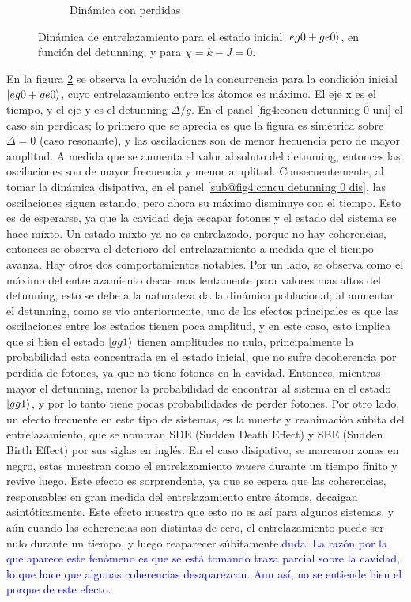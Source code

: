 \begin{figure}[h]
\begin{subfigure}{0.49\textwidth}
        \caption{Dinámica con perdidas}
        \label{fig4:concu detunning 0 dis}
    \end{subfigure}
    \caption{Dinámica de entrelazamiento para el estado inicial $\ket{eg0+ge0}$, en función del detunning, y para $\chi=k-J=0$.}
    \label{fig4:concu detunning 0}
\end{figure}
En la figura \ref{fig4:concu detunning 0} se observa la evolución de la concurrencia para la condición inicial $\ket{eg0+ge0}$, cuyo entrelazamiento entre los átomos es máximo. El eje x es el tiempo, y el eje y es el detunning $\Delta/g$. En el panel \ref{fig4:concu detunning 0 uni} el caso sin perdidas; lo primero que se aprecia es que la figura es simétrica sobre $\Delta=0$ (caso resonante), y las oscilaciones son de menor frecuencia pero de mayor amplitud. A medida que se aumenta el valor absoluto del detunning, entonces las oscilaciones son de mayor frecuencia y menor amplitud. Consecuentemente, al tomar la dinámica disipativa, en el panel \ref{sub@fig4:concu detunning 0 dis}, las oscilaciones siguen estando, pero ahora su máximo disminuye con el tiempo. Esto es de esperarse, ya que la cavidad deja escapar fotones y el estado del sistema se hace mixto. Un estado mixto ya no es entrelazado, porque no hay coherencias, entonces se observa el deterioro del entrelazamiento a medida que el tiempo avanza. Hay otros dos comportamientos notables. 
Por un lado, se observa como el máximo del entrelazamiento decae mas lentamente para valores mas altos del detunning, esto se debe a la naturaleza da la dinámica poblacional; al aumentar el detunning, como se vio anteriormente, uno de los efectos principales es que las oscilaciones entre los estados tienen poca amplitud, y en este caso, esto implica que si bien el estado $\ket{gg1}$ tienen amplitudes no nula, principalmente la probabilidad esta concentrada en el estado inicial, que no sufre decoherencia por perdida de fotones, ya que no tiene fotones en la cavidad. Entonces, mientras mayor el detunning, menor la probabilidad de encontrar al sistema en el estado $\ket{gg1}$, y por lo tanto tiene pocas probabilidades de perder fotones. Por otro lado, un efecto frecuente en este tipo de sistemas, es la muerte y reanimación súbita del entrelazamiento, que se nombran SDE (Sudden Death Effect) y SBE (Sudden Birth Effect) por sus siglas en inglés. En el caso disipativo, se marcaron zonas en negro, estas muestran como el entrelazamiento \textit{muere} durante un tiempo finito y revive luego. Este efecto es sorprendente, ya que se espera que las coherencias, responsables en gran medida del entrelazamiento entre átomos, decaigan asintóticamente. Este efecto muestra que esto no es así para algunos sistemas, y aún cuando las coherencias son distintas de cero, el entrelazamiento puede ser nulo durante un tiempo, y luego reaparecer súbitamente.\textcolor{blue}{duda: La razón por la que aparece este fenómeno es que se está tomando traza parcial sobre la cavidad, lo que hace que algunas coherencias desaparezcan. Aun así, no se entiende bien el porque de este efecto.}


